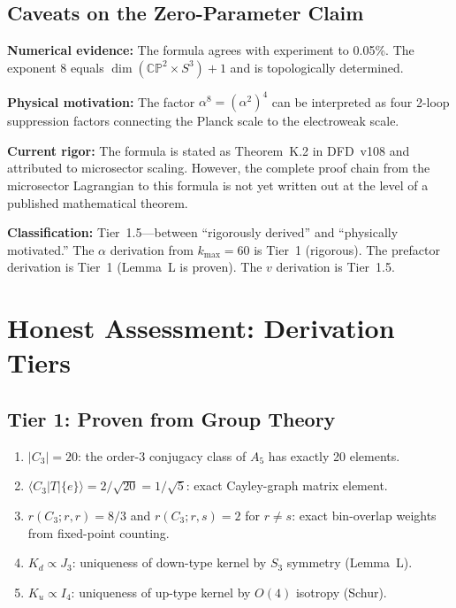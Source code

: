 \documentclass[11pt,a4paper]{article}
\newcommand{\CP}{\mathbb{CP}}
\theoremstyle{remark}
\begin{document}
\subsection{Caveats on the Zero-Parameter Claim}

\begin{tcolorbox}[colback=yellow!5!white, colframe=orange!60!black,
  title={Honest Assessment of $v = M_P\alpha^8\sqrt{2\pi}$}]
\textbf{Numerical evidence:} The formula agrees with experiment to 0.05\%.
The exponent 8 equals $\dim(\CP^2 \times S^3) + 1$ and is topologically
determined.

\textbf{Physical motivation:} The factor $\alpha^8 = (\alpha^2)^4$ can be
interpreted as four 2-loop suppression factors connecting the Planck scale
to the electroweak scale.

\textbf{Current rigor:} The formula is stated as Theorem~K.2 in DFD~v108 and
attributed to microsector scaling.  However, the complete proof chain from the
microsector Lagrangian to this formula is not yet written out at the level of
a published mathematical theorem.

\textbf{Classification:} Tier~1.5---between ``rigorously derived'' and
``physically motivated.''  The $\alpha$ derivation from $k_{\max} = 60$ is
Tier~1 (rigorous).  The prefactor derivation is Tier~1 (Lemma~L is proven).
The $v$ derivation is Tier~1.5.
\end{tcolorbox}


\section{Honest Assessment: Derivation Tiers}
\label{sec:honest}

\subsection{Tier 1: Proven from Group Theory}

\begin{enumerate}
\item $|C_3| = 20$: the order-3 conjugacy class of $A_5$ has exactly 20 elements.
\item $\langle C_3|T|\{e\}\rangle = 2/\sqrt{20} = 1/\sqrt{5}$: exact Cayley-graph
  matrix element.
\item $r(C_3; r, r) = 8/3$ and $r(C_3; r, s) = 2$ for $r \neq s$: exact
  bin-overlap weights from fixed-point counting.
\item $K_d \propto J_3$: uniqueness of down-type kernel by $S_3$ symmetry (Lemma~L).
\item $K_u \propto I_4$: uniqueness of up-type kernel by $O(4)$ isotropy (Schur).
\end{enumerate}
\end{document}
